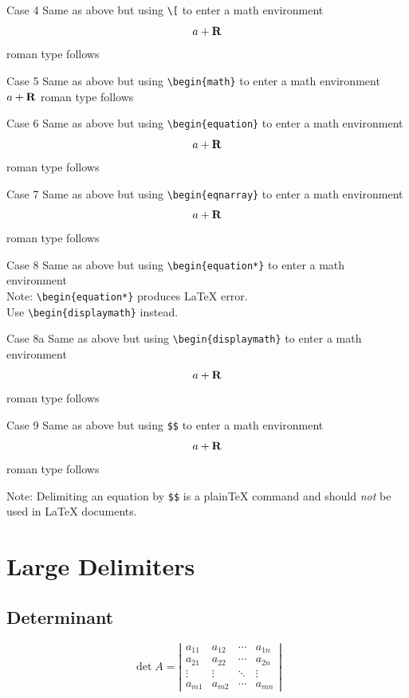 ﻿\documentclass{article}
\begin{document}
Case 4 Same as above but using \verb#\[# to enter a math environment \[a+\bf R\] 
roman type follows

Case 5 Same as above but using \verb#\begin{math}# to enter a math environment
\begin{math}a+\bf R\end{math} roman type follows

Case 6 Same as above but using \verb#\begin{equation}# to enter a math environment
\begin{equation}a+ \bf R\end{equation} roman type follows

Case 7 Same as above but using \verb#\begin{eqnarray}# to enter a math environment
\begin{eqnarray}a+ \bf R\end{eqnarray} roman type follows

Case 8 Same as above but using \verb#\begin{equation*}# to enter a math environment \\
Note: \verb#\begin{equation*}# produces LaTeX error.\\
Use \verb#\begin{displaymath}# instead.

Case 8a Same as above but using \verb#\begin{displaymath}# to enter a math environment
\begin{displaymath}a+ \bf R\end{displaymath} roman type follows

Case 9 Same as above but using \verb#$$# to enter a math environment
$$a+ \bf R$$ roman type follows

Note: Delimiting an equation by \verb|$$| is a plain\TeX{} command and
should \emph{not} be used in \LaTeX{} documents.


\section{Large Delimiters}

\subsection{Determinant}

\[
\det A = \left| \begin{array}{cccc}
a_{11} & a_{12} & \cdots & a_{1n}\\
a_{21} & a_{22} & \cdots & a_{2n}\\
\vdots & \vdots & \ddots & \vdots\\
a_{m1} & a_{m2} & \cdots & a_{mn}
\end{array} \right|
\]
\end{document}
